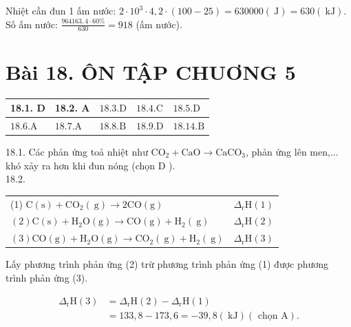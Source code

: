 \documentclass[10pt]{article}
\begin{document}
Nhiệt cần đun 1 ấm nước: $2 \cdot 10^{3} \cdot 4,2 \cdot(100-25)=630000(\mathrm{~J})=630(\mathrm{~kJ})$.\\
Số ấm nước: $\frac{964163,4 \cdot 60 \%}{630}=918$ (ấm nước).

\section*{Bài 18. ÔN TẬP CHUƠNG 5}
\begin{center}
\begin{tabular}{|l|l|l|l|l|}
\hline
18.1. D & 18.2. A & $18.3 . \mathrm{D}$ & $18.4 . \mathrm{C}$ & $18.5 . \mathrm{D}$ \\
\hline
$18.6 . \mathrm{A}$ & $18.7 . \mathrm{A}$ & $18.8 . \mathrm{B}$ & $18.9 . \mathrm{D}$ & $18.14 . \mathrm{B}$ \\
\hline
\end{tabular}
\end{center}

18.1. Các phản ứng toả nhiệt như $\mathrm{CO}_{2}+\mathrm{CaO} \rightarrow \mathrm{CaCO}_{3}$, phản ứng lên men,... khó xảy ra hơn khi đun nóng (chọn D ).\\
18.2.

\begin{center}
\begin{tabular}{ll}
(1) $\mathrm{C}(\mathrm{s})+\mathrm{CO}_{2}(\mathrm{~g}) \rightarrow 2 \mathrm{CO}(\mathrm{g})$ & $\Delta_{\mathrm{r}} \mathrm{H}(1)$ \\
$(2) \mathrm{C}(\mathrm{s})+\mathrm{H}_{2} \mathrm{O}(\mathrm{g}) \rightarrow \mathrm{CO}(\mathrm{g})+\mathrm{H}_{2}(\mathrm{~g})$ & $\Delta_{\mathrm{r}} \mathrm{H}(2)$ \\
$(3) \mathrm{CO}(\mathrm{g})+\mathrm{H}_{2} \mathrm{O}(\mathrm{g}) \rightarrow \mathrm{CO}_{2}(\mathrm{~g})+\mathrm{H}_{2}(\mathrm{~g})$ & $\Delta_{\mathrm{r}} \mathrm{H}(3)$ \\
\end{tabular}
\end{center}

Lấy phương trình phản ứng (2) trừ phương trình phản ứng (1) được phương trình phản ứng (3).

$$
\begin{aligned}
\Delta_{\mathrm{r}} \mathrm{H}(3) & =\Delta_{\mathrm{r}} \mathrm{H}(2)-\Delta_{\mathrm{r}} \mathrm{H}(1) \\
& =133,8-173,6=-39,8(\mathrm{~kJ})(\text { chọn } \mathrm{A}) .
\end{aligned}
$$
\end{document}
